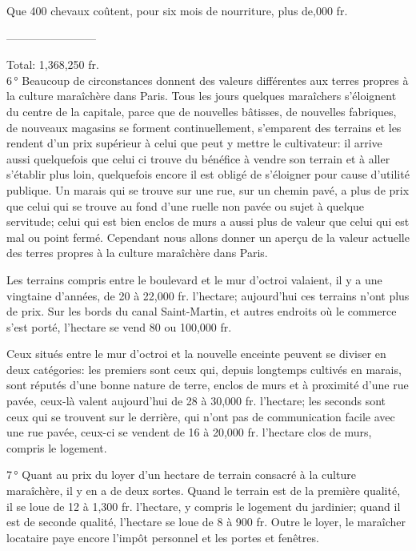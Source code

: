 \documentclass[10pt,a4paper]{book}
\begin{document}
Que 400 chevaux coûtent, pour six mois de nourriture, plus de,000 fr.

\hfill ------------------------

\hfill Total: 1,368,250 fr.\\

6\,° Beaucoup de circonstances donnent des valeurs différentes aux terres propres à la culture maraîchère dans Paris. Tous les jours quelques maraîchers s'éloignent du centre de la capitale, parce que de nouvelles bâtisses, de nouvelles fabriques, de nouveaux magasins se forment continuellement, s'emparent des terrains et les rendent d'un prix supérieur à celui que peut y mettre le cultivateur: il arrive aussi quelquefois que celui ci trouve du bénéfice à vendre son terrain et à aller s'établir plus loin, quelquefois encore il est obligé de s'éloigner pour cause d'utilité publique. Un marais qui se trouve sur une rue, sur un chemin pavé, a plus de prix que celui qui se trouve au fond d'une ruelle non pavée ou sujet à quelque servitude; celui qui est bien enclos de murs a aussi plus de valeur que celui qui est mal ou point fermé. Cependant nous allons donner un aperçu de la valeur actuelle des terres propres à la culture maraîchère dans Paris.

Les terrains compris entre le boulevard et le mur d'octroi valaient, il y a une vingtaine d'années, de 20 à 22,000 fr. l'hectare; aujourd'hui ces terrains n'ont plus de prix. Sur les bords du canal Saint-Martin, et autres endroits où le commerce s'est porté, l'hectare se vend 80 ou 100,000 fr.

Ceux situés entre le mur d'octroi et la nouvelle enceinte peuvent se diviser en deux catégories: les premiers sont ceux qui, depuis longtemps cultivés en marais, sont réputés d'une bonne nature de terre, enclos de murs et à proximité d'une rue pavée, ceux-là valent aujourd'hui de 28 à 30,000 fr. l'hectare; les seconds sont ceux qui se trouvent sur le derrière, qui n'ont pas de communication facile avec une rue pavée, ceux-ci se vendent de 16 à 20,000 fr. l'hectare clos de murs, compris le logement.

7\,° Quant au prix du loyer d'un hectare de terrain consacré à la culture maraîchère, il y en a de deux sortes. Quand le terrain est de la première qualité, il se loue de 12 à 1,300 fr. l'hectare, y compris le logement du jardinier; quand il est de seconde qualité, l'hectare se loue de 8 à 900 fr. Outre le loyer, le maraîcher locataire paye encore l'impôt personnel et les portes et fenêtres.
\end{document}

